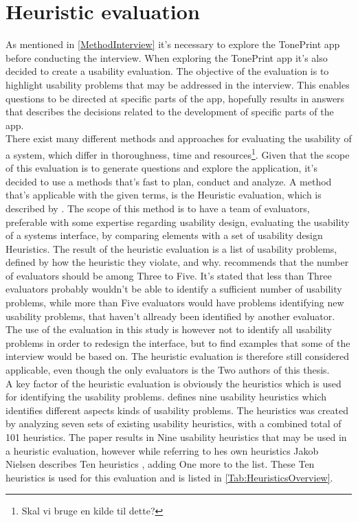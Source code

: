 \section{Heuristic evaluation}
\label{SectionHeuristicEvaluation}
As mentioned in \autoref{MethodInterview} it's necessary to explore the TonePrint app before conducting the interview. When exploring the TonePrint app it's also decided to create a usability evaluation. The objective of the evaluation is to highlight usability problems that may be addressed in the interview. This enables questions to be directed at specific parts of the app, hopefully results in answers that describes the decisions related to the development of specific parts of the app. \\
There exist many different methods and approaches for evaluating the usability of a system, which differ in thoroughness, time and resources\footnote{Skal vi bruge en kilde til dette?}. Given that the scope of this evaluation is to generate questions and explore the application, it's decided to use a methods that's fast to plan, conduct and analyze. A method that's applicable with the given terms, is the Heuristic evaluation, which is described by \parencite{WEB:Nielsen1994HowTo}. The scope of this method is to have a team of evaluators, preferable with some expertise regarding usability design, evaluating the usability of a systems interface, by comparing elements with a set of usability design Heuristics. The result of the heuristic evaluation is a list of usability problems, defined by how the heuristic they violate, and why. \textcite{WEB:Nielsen1994HowTo} recommends that the number of evaluators should be among Three to Five. It's stated that less than Three evaluators probably wouldn't be able to identify a sufficient number of usability problems, while more than Five evaluators would have problems identifying new usability problems, that haven't allready been identified by another evaluator. The use of the evaluation in this study is however not to identify all usability problems in order to redesign the interface, but to find examples that some of the interview would be based on. The heuristic evaluation is therefore still considered applicable, even though the only evaluators is the Two authors of this thesis.\\ 
A key factor of the heuristic evaluation is obviously the heuristics which is used for identifying the usability problems. \textcite{WEB:Nielsen1994} defines nine usability heuristics which identifies different aspects kinds of usability problems. The heuristics was created by analyzing seven sets of existing usability heuristics, with a combined total of 101 heuristics. The paper results in Nine usability heuristics that may be used in a heuristic evaluation, however while referring to hes own heuristics \parencite{WEB:Nielsen1994} Jakob Nielsen describes Ten heuristics \parencite{WEB:Nielsen1994Ten}, adding One more to the list. These Ten heuristics is used for this evaluation and is listed in \autoref{Tab:HeuristicsOverview}.

